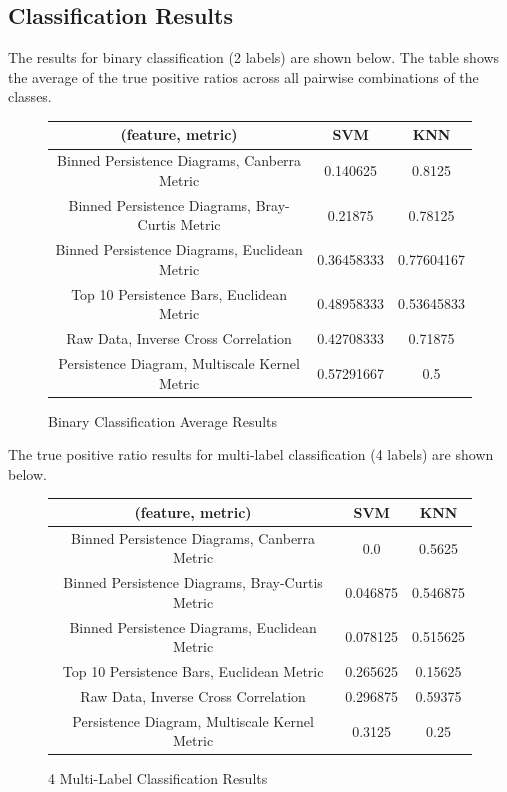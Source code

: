 \documentclass[12pt]{article}
\begin{document}
\subsection{Classification Results}
\-\hspace{1cm} The results for binary classification (2 labels) are shown below.
The table shows the average of the true positive ratios across all pairwise
combinations of the classes.
\begin{figure}[!ht]
\begin{center}
\begin{tabular}{||c|c|c||}
\hline
(feature, metric) & SVM & KNN \\ 
\hline 
Binned Persistence Diagrams, Canberra Metric & 0.140625 & 0.8125 \\ 
\hline
Binned Persistence Diagrams, Bray-Curtis Metric & 0.21875 & 0.78125 \\
\hline 
Binned Persistence Diagrams, Euclidean Metric & 0.36458333 & 0.77604167 \\ 
\hline
Top 10 Persistence Bars, Euclidean Metric & 0.48958333 & 0.53645833 \\
\hline
Raw Data, Inverse Cross Correlation & 0.42708333 & 0.71875 \\
\hline
Persistence Diagram, Multiscale Kernel Metric & 0.57291667 & 0.5 \\
\hline
\end{tabular}
\end{center}
\caption{Binary Classification Average Results}
\end{figure}
\newline \-\hspace{1cm} The true positive ratio results for multi-label
classification (4 labels) are shown below.
\begin{figure}[!ht]
\begin{center}
\begin{tabular}{||c|c|c||}
\hline
(feature, metric) & SVM & KNN \\ 
\hline 
Binned Persistence Diagrams, Canberra Metric & 0.0 & 0.5625 \\ 
\hline
Binned Persistence Diagrams, Bray-Curtis Metric & 0.046875 & 0.546875 \\
\hline 
Binned Persistence Diagrams, Euclidean Metric & 0.078125 & 0.515625 \\ 
\hline
Top 10 Persistence Bars, Euclidean Metric & 0.265625 & 0.15625 \\
\hline
Raw Data, Inverse Cross Correlation & 0.296875 & 0.59375 \\
\hline
Persistence Diagram, Multiscale Kernel Metric & 0.3125 & 0.25 \\
\hline
\end{tabular}
\end{center}
\caption{4 Multi-Label Classification Results}
\end{figure}
	
\end{document}
